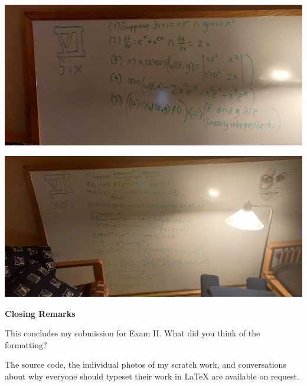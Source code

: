\documentclass[12pt]{article}
\begin{document}
\includegraphics[scale=0.075]{6.jpg}

\includegraphics[scale=0.075]{7.jpg}

\medskip

\medskip

\textbf{Closing Remarks}

This concludes my submission for Exam II.
What did you think of the formatting?

The source code, the individual photos of my scratch work,
and conversations about why everyone should
typeset their work in \LaTeX\; are available on request.
\end{document}
